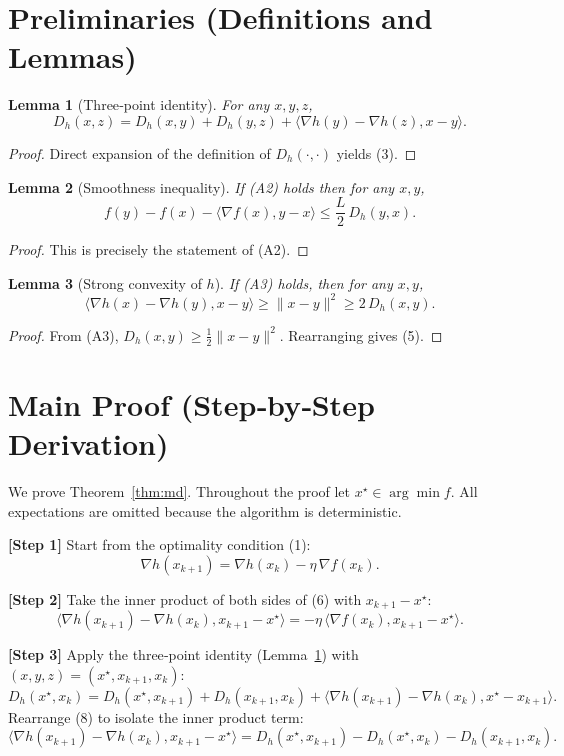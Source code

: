 \documentclass{article}
\newtheorem{lemma}{Lemma}
\newcommand{\Breg}[2]{D_{h}(#1,#2)}
\newcommand{\inner}[2]{\langle #1,#2\rangle}
\newcommand{\grad}{\nabla}
\begin{document}
\section*{Preliminaries (Definitions and Lemmas)}
\begin{lemma}[Three‑point identity]\label{lem:3pt}
For any $x,y,z$,
\[
\Breg{x}{z}= \Breg{x}{y}+ \Breg{y}{z}+ \inner{\grad h(y)-\grad h(z)}{x-y}.
\tag{3}
\]
\end{lemma}
\begin{proof}
Direct expansion of the definition of $\Breg{\cdot}{\cdot}$ yields (3). \hfill\qedsymbol
\end{proof}
\begin{lemma}[Smoothness inequality]\label{lem:smooth}
If (A2) holds then for any $x,y$,
\[
f(y)-f(x)-\inner{\grad f(x)}{y-x}\le \frac{L}{2}\,\Breg{y}{x}.
\tag{4}
\]
\end{lemma}
\begin{proof}
This is precisely the statement of (A2). \hfill\qedsymbol
\end{proof}
\begin{lemma}[Strong convexity of $h$]\label{lem:strong}
If (A3) holds, then for any $x,y$,
\[
\inner{\grad h(x)-\grad h(y)}{x-y}\ge \|x-y\|^{2}\ge 2\,\Breg{x}{y}.
\tag{5}
\]
\end{lemma}
\begin{proof}
From (A3), $\Breg{x}{y}\ge \frac12\|x-y\|^{2}$. Rearranging gives (5). \hfill\qedsymbol
\end{proof}

\vspace{1em}
\section*{Main Proof (Step‑by‑Step Derivation)}
We prove Theorem~\ref{thm:md}. Throughout the proof let $x^{\star}\in\arg\min f$.
All expectations are omitted because the algorithm is deterministic.

\bigskip
\noindent\textbf{[Step 1]}  Start from the optimality condition (1):
\[
\grad h(x_{k+1}) = \grad h(x_k)-\eta\,\grad f(x_k).
\tag{6}
\]

\noindent\textbf{[Step 2]}  Take the inner product of both sides of (6) with
$x_{k+1}-x^{\star}$:
\[
\inner{\grad h(x_{k+1})-\grad h(x_k)}{x_{k+1}-x^{\star}}
= -\eta\,\inner{\grad f(x_k)}{x_{k+1}-x^{\star}}.
\tag{7}
\]

\noindent\textbf{[Step 3]}  Apply the three‑point identity (Lemma~\ref{lem:3pt})
with $(x,y,z)=(x^{\star},x_{k+1},x_k)$:
\[
\Breg{x^{\star}}{x_k}= \Breg{x^{\star}}{x_{k+1}}+\Breg{x_{k+1}}{x_k}
+ \inner{\grad h(x_{k+1})-\grad h(x_k)}{x^{\star}-x_{k+1}}.
\tag{8}
\]
Rearrange (8) to isolate the inner product term:
\[
\inner{\grad h(x_{k+1})-\grad h(x_k)}{x_{k+1}-x^{\star}}
= \Breg{x^{\star}}{x_{k+1}}-\Breg{x^{\star}}{x_k}
- \Breg{x_{k+1}}{x_k}.
\tag{9}
\]
\end{document}
